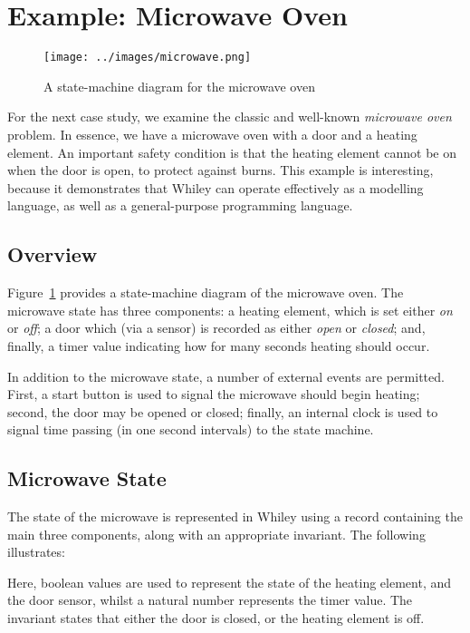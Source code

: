 \newpage
\section{Example: Microwave Oven}
\label{microwave}
\begin{figure}[!t]
\centering
\texttt{[image: ../images/microwave.png]}
\caption{A state-machine diagram for the microwave oven}
\label{fig_microwave}
\end{figure}

For the next case study, we examine the classic and well-known {\em microwave oven} problem.  In essence, we have a microwave oven with a door and a heating element.  An important safety condition is that the heating element cannot be on when the door is open, to protect against burns.  This example is interesting, because it demonstrates that Whiley can operate effectively as a modelling language, as well as a general-purpose programming language.

\subsection{Overview}
Figure~\ref{fig_microwave} provides a state-machine diagram of the
microwave oven.  The microwave state has three components: a heating
element, which is set either {\em on} or {\em off}; a door which (via
a sensor) is recorded as either {\em open} or {\em closed}; and, finally, a timer value indicating how for many seconds heating should occur.

In addition to the microwave state, a number of external events are permitted.  First, a start button is used to signal the microwave should begin heating; second, the door may be opened or closed; finally, an internal clock is used to signal time passing (in one second intervals) to the state machine.

\subsection{Microwave State}
The state of the microwave is represented in Whiley using a record containing the main three components, along with an appropriate invariant.  The following illustrates:



Here, boolean values are used to represent the state of the heating element, and the door sensor, whilst a natural number represents the timer value.  The invariant states that either the door is closed, or the heating element is off.

